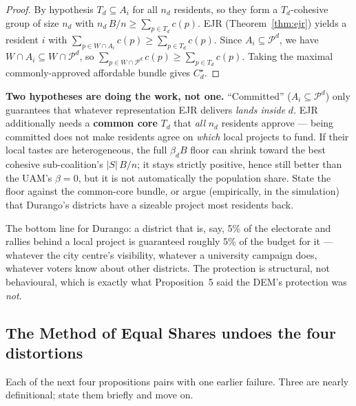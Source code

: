 \documentclass[11pt,letterpaper]{article}
\theoremstyle{definition}
\theoremstyle{plain}
\theoremstyle{remark}
\newcommand{\Pset}{\mathcal{P}}
\newcommand{\budget}{B}
\newcommand{\cost}{c}
\begin{document}
\begin{proof}
By hypothesis $T_d\subseteq A_i$ for all $n_d$ residents, so they form a $T_d$-cohesive group of
size $n_d$ with $n_d\,\budget/n\ge\sum_{p\in T_d}\cost(p)$. EJR (Theorem~\ref{thm:ejr}) yields a
resident $i$ with $\sum_{p\in W\cap A_i}\cost(p)\ge\sum_{p\in T_d}\cost(p)$. Since
$A_i\subseteq\Pset^d$, we have $W\cap A_i\subseteq W\cap\Pset^d$, so
$\sum_{p\in W\cap\Pset^d}\cost(p)\ge\sum_{p\in T_d}\cost(p)$. Taking the maximal commonly-approved
affordable bundle gives $C_d^\star$.
\end{proof}

\begin{watchout}
\textbf{Two hypotheses are doing the work, not one.} ``Committed'' ($A_i\subseteq\Pset^d$) only
guarantees that whatever representation EJR delivers \emph{lands inside} $d$. EJR additionally needs
a \textbf{common core} $T_d$ that \emph{all} $n_d$ residents approve --- being committed does not make
residents agree on \emph{which} local projects to fund. If their local tastes are heterogeneous, the
full $\beta_d\budget$ floor can shrink toward the best cohesive sub-coalition's $|S|\,\budget/n$;
it stays strictly positive, hence still better than the UAM's $\beta=0$, but it is not automatically
the population share. State the floor against the common-core bundle, or argue (empirically, in the
simulation) that Durango's districts have a sizeable project most residents back.
\end{watchout}

\begin{connection}
The bottom line for Durango: a district that is, say, 5\% of the electorate and rallies behind a
local project is guaranteed roughly 5\% of the budget for it --- whatever the city centre's
visibility, whatever a university campaign does, whatever voters know about other districts. The
protection is structural, not behavioural, which is exactly what Proposition~5 said the DEM's
protection was \emph{not}.
\end{connection}

\subsection{The Method of Equal Shares undoes the four distortions}

Each of the next four propositions pairs with one earlier failure. Three are nearly definitional;
state them briefly and move on.
\end{document}
